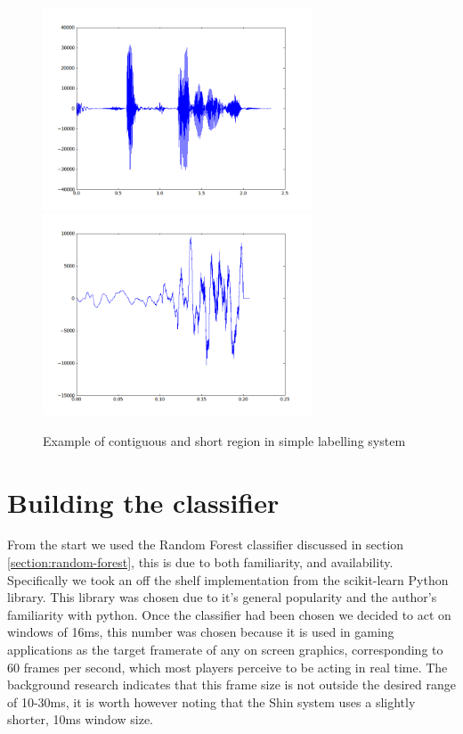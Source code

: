 \documentclass[ %
                    author={Sam Phippen},
                supervisor={Dr. Rafal Bogacz},
                     title={Real time voice activity detectors in noisy personal computing environments},
                  subtitle={},
                    degree={MEng},
                      year={2012} ]{thesis}
\begin{document}
\begin{figure}
    \includegraphics[width=8cm]{labelling1.png}
    \includegraphics[width=8cm]{labelling2.png}
    \label{img:labelling_example}
    \caption{Example of contiguous and short region in simple labelling system}
\end{figure}

\section{Building the classifier}

From the start we used the Random Forest classifier discussed in section
\ref{section:random-forest}, this is due to both familiarity, and availability.
Specifically we took an off the shelf implementation from the
scikit-learn\cite{sklearn} Python library. This library was chosen due to it's
general popularity and the author's familiarity with python. Once the
classifier had been chosen we decided to act on windows of 16ms, this number
was chosen because it is used in gaming applications as the target framerate of
any on screen graphics, corresponding to 60 frames per second, which most
players perceive to be acting in real time. The background research indicates
that this frame size is not outside the desired range of 10-30ms, it is worth
however noting that the Shin\cite{shin} system uses a slightly shorter, 10ms
window size.
\end{document}
